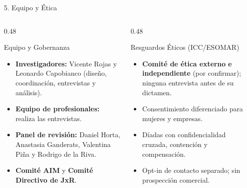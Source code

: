 \documentclass[aspectratio=169, 10pt]{beamer}
\begin{document}
\begin{frame}{5. Equipo y Ética}
  \begin{columns}[T]
    \begin{column}{0.48\textwidth}
      \begin{block}{Equipo y Gobernanza}
        \small
        \begin{itemize}
          \item \textbf{Investigadores:} Vicente Rojas y Leonardo Capobianco (diseño, coordinación, entrevistas y análisis).
          \item \textbf{Equipo de profesionales:} realiza las entrevistas.
          \item \textbf{Panel de revisión:} Daniel Horta, Anastasia Ganderats, Valentina Piña y Rodrigo de la Riva.
          \item \textbf{Comité AIM} y \textbf{Comité Directivo de JxR}.
        \end{itemize}
      \end{block}
    \end{column}
    \begin{column}{0.48\textwidth}
      \begin{block}{Resguardos Éticos (ICC/ESOMAR)}
        \small
        \begin{itemize}
          \item \textbf{Comité de ética externo e independiente} (por confirmar); ninguna entrevista antes de su dictamen.
          \item Consentimiento diferenciado para mujeres y empresas.
          \item Díadas con confidencialidad cruzada, contención y compensación.
          \item Opt-in de contacto separado; sin prospección comercial.
        \end{itemize}
      \end{block}
    \end{column}
  \end{columns}
\end{frame}
\end{document}
